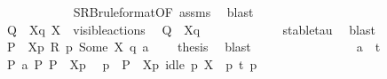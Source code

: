 \begin{isabellebody}
\ \ \ \ \ \ \ \ \ \ \isamarkupfalse%
\ SRB{\isacharunderscore}{\kern0pt}ruleformat{\isacharparenleft}{\kern0pt}{}{\isacharparenright}{\kern0pt}{\isacharbrackleft}{\kern0pt}OF\ assms{\isacharparenleft}{\kern0pt}{}{\isacharparenright}{\kern0pt}{\isacharbrackright}{\kern0pt}\ \isamarkupfalse%
\ blast\isanewline
\ \ \ \ \ \ \ \ \isamarkupfalse%
\ {\isacartoucheopen}Q\ {\isacharequal}{\kern0pt}\ {\isasymtheta}{\isacharbrackleft}{\kern0pt}X{\isacharbrackright}{\kern0pt}{\isacharparenleft}{\kern0pt}q{\isacharparenright}{\kern0pt}{\isacartoucheclose}\ {\isacartoucheopen}X\ {\isasymsubseteq}\ visible{\isacharunderscore}{\kern0pt}actions{\isacartoucheclose}\ \isamarkupfalse%
\ {\isacartoucheopen}Q\ {\isasymlongmapsto}\isactrlsup {\isasymtheta}{\isasymtau}\ {\isasymtheta}{\isacharbrackleft}{\kern0pt}X{\isacharbrackright}{\kern0pt}{\isacharparenleft}{\kern0pt}q{\isacharprime}{\kern0pt}{\isacharparenright}{\kern0pt}{\isacartoucheclose}\ \isanewline
\ \ \ \ \ \ \ \ \ \ \isamarkupfalse%
\ stable{\isacharunderscore}{\kern0pt}tau\ \isamarkupfalse%
\ blast\isanewline
\ \ \ \ \ \ \ \ \isamarkupfalse%
\ {\isacartoucheopen}P{\isacharprime}{\kern0pt}\ {\isacharequal}{\kern0pt}\ {\isasymtheta}{\isacharbrackleft}{\kern0pt}X{\isacharbrackright}{\kern0pt}{\isacharparenleft}{\kern0pt}p{\isacharprime}{\kern0pt}{\isacharparenright}{\kern0pt}{\isacartoucheclose}\ {\isacartoucheopen}R\ p{\isacharprime}{\kern0pt}\ {\isacharparenleft}{\kern0pt}Some\ X{\isacharparenright}{\kern0pt}\ q{\isacharprime}{\kern0pt}{\isacartoucheclose}\ {\isacartoucheopen}a\ {\isacharequal}{\kern0pt}\ {\isasymtau}{\isacartoucheclose}\ \isamarkupfalse%
\ {\isacharquery}{\kern0pt}thesis\ \isamarkupfalse%
\ blast\isanewline
\ \ \ \ \ \ \isamarkupfalse%
\isanewline
\ \ \ \ \ \ \ \ \isamarkupfalse%
\ {\isacartoucheopen}a\ {\isacharequal}{\kern0pt}\ t{\isacartoucheclose}\isanewline
\ \ \ \ \ \ \ \ \isamarkupfalse%
\ {\isacartoucheopen}P\ {\isasymlongmapsto}\isactrlsup {\isasymtheta}a\ P{\isacharprime}{\kern0pt}{\isacartoucheclose}\ {\isacartoucheopen}P\ {\isacharequal}{\kern0pt}\ {\isasymtheta}{\isacharbrackleft}{\kern0pt}X{\isacharbrackright}{\kern0pt}{\isacharparenleft}{\kern0pt}p{\isacharparenright}{\kern0pt}{\isacartoucheclose}\ \isamarkupfalse%
\ p{\isacharprime}{\kern0pt}\ \ {\isacartoucheopen}P{\isacharprime}{\kern0pt}\ {\isacharequal}{\kern0pt}\ {\isasymtheta}{\isacharbrackleft}{\kern0pt}X{\isacharbrackright}{\kern0pt}{\isacharparenleft}{\kern0pt}p{\isacharprime}{\kern0pt}{\isacharparenright}{\kern0pt}{\isacartoucheclose}\ {\isacartoucheopen}idle\ p\ X{\isacartoucheclose}\ {\isacartoucheopen}\ p\ {\isasymlongmapsto}t\ p{\isacharprime}{\kern0pt}{\isacartoucheclose}\isanewline

\end{isabellebody}
